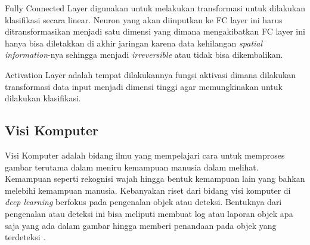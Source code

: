 \par Fully Connected Layer digunakan untuk melakukan transformasi untuk dilakukan klasifikasi secara linear.
Neuron yang akan diinputkan ke FC layer ini harus ditransformasikan menjadi satu dimensi yang dimana
mengakibatkan FC layer ini hanya bisa diletakkan di akhir jaringan karena data kehilangan \emph{spatial information}-nya
sehingga menjadi \emph{irreversible} atau tidak bisa dikembalikan.

\par Activation Layer adalah tempat dilakukannya fungsi aktivasi dimana dilakukan transformasi data input
menjadi dimensi tinggi agar memungkinakan untuk dilakukan klasifikasi\cite{putra2016klasifikasi}.







\subsection{Visi Komputer}
\label{sec:visikomputer}

Visi Komputer adalah bidang ilmu yang mempelajari cara untuk memproses gambar terutama dalam meniru
kemampuan manusia dalam melihat. Kemampuan seperti rekognisi wajah hingga bentuk kemampuan lain yang bahkan
melebihi kemampuan manusia. Kebanyakan riset dari bidang visi komputer di \emph{deep learning} berfokus pada
pengenalan objek atau deteksi. Bentuknya dari pengenalan atau deteksi ini bisa meliputi membuat log atau laporan
objek apa saja yang ada dalam gambar hingga memberi penandaan pada objek yang terdeteksi \cite{Goodfellow-et-al-2016}. 

